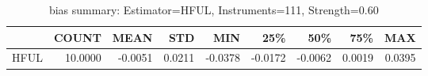 \begin{table}[ht]
\centering
\caption{bias summary: Estimator=HFUL, Instruments=111, Strength=0.60}
\begin{tabular}{lrrrrrrrr}
\toprule
 & COUNT & MEAN & STD & MIN & 25\% & 50\% & 75\% & MAX \\
\midrule
HFUL & 10.0000 & -0.0051 & 0.0211 & -0.0378 & -0.0172 & -0.0062 & 0.0019 & 0.0395 \\
\bottomrule
\end{tabular}
\end{table}
